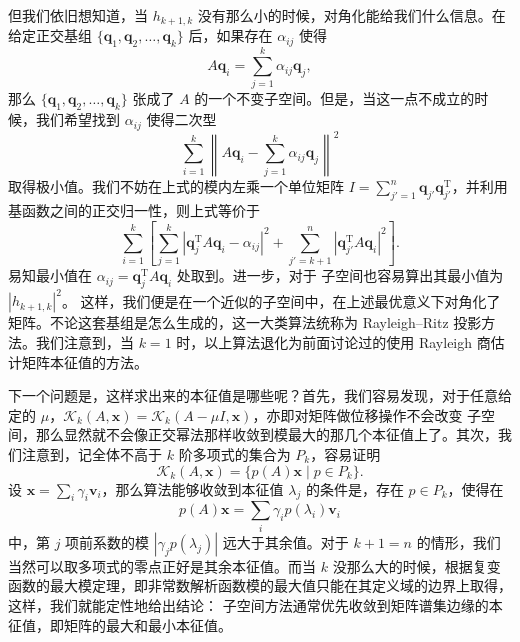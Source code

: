 但我们依旧想知道，当 $h_{k+1,k}$ 没有那么小的时候，对角化能给我们什么信息。在给定正交基组 $\{\bm q_1,\bm q_2,\ldots,\bm q_k\}$ 后，如果存在 $\alpha_{ij}$ 使得
\begin{equation}
A\bm q_i=\sum_{j=1}^k\alpha_{ij}\bm q_j,
\tag{3.5.14}
\end{equation}
那么 $\{\bm q_1,\bm q_2,\ldots,\bm q_k\}$ 张成了 $A$ 的一个不变子空间。但是，当这一点不成立的时候，我们希望找到 $\alpha_{ij}$ 使得二次型
\begin{equation}
\sum_{i=1}^k\left\lVert A\bm q_i-\sum_{j=1}^k\alpha_{ij}\bm q_j\right\rVert^2
\tag{3.5.15}
\end{equation}
取得极小值。我们不妨在上式的模内左乘一个单位矩阵 $I=\sum_{j'=1}^n\bm q_{j'}\bm q_{j'}^{\mathrm T}$，并利用基函数之间的正交归一性，则上式等价于
\begin{equation}
\sum_{i=1}^k\left[
\sum_{j=1}^k\left|\bm q_j^{\mathrm T}A\bm q_i-\alpha_{ij}\right|^2
+\sum_{j'=k+1}^n\left|\bm q_{j'}^{\mathrm T}A\bm q_i\right|^2
\right].
\tag{3.5.16}
\end{equation}
易知最小值在 $\alpha_{ij}=\bm q_j^{\mathrm T}A\bm q_i$ 处取到。进一步，对于  子空间也容易算出其最小值为 $|h_{k+1,k}|^2$。
这样，我们便是在一个近似的子空间中，在上述最优意义下对角化了矩阵。不论这套基组是怎么生成的，这一大类算法统称为 Rayleigh--Ritz 投影方法。我们注意到，当 $k=1$ 时，以上算法退化为前面讨论过的使用 Rayleigh 商估计矩阵本征值的方法。

下一个问题是，这样求出来的本征值是哪些呢？首先，我们容易发现，对于任意给定的 $\mu$，$\mathcal K_k(A,\bm x)=\mathcal K_k(A-\mu I,\bm x)$，亦即对矩阵做位移操作不会改变  子空间，那么显然就不会像正交幂法那样收敛到模最大的那几个本征值上了。其次，我们注意到，记全体不高于 $k$ 阶多项式的集合为 $P_k$，容易证明
\begin{equation}
\mathcal K_k(A,\bm x)=\{p(A)\bm x\mid p\in P_k\}.
\tag{3.5.17}
\end{equation}
设 $\bm x=\sum_i\gamma_i\bm v_i$，那么算法能够收敛到本征值 $\lambda_j$ 的条件是，存在 $p\in P_k$，使得在
\begin{equation}
p(A)\bm x=\sum_i\gamma_i p(\lambda_i)\bm v_i
\tag{3.5.18}
\end{equation}
中，第 $j$ 项前系数的模 $|\gamma_jp(\lambda_j)|$ 远大于其余值。对于 $k+1=n$ 的情形，我们当然可以取多项式的零点正好是其余本征值。而当 $k$ 没那么大的时候，根据复变函数的最大模定理，即非常数解析函数模的最大值只能在其定义域的边界上取得，这样，我们就能定性地给出结论： 子空间方法通常优先收敛到矩阵谱集边缘的本征值，即矩阵的最大和最小本征值。

